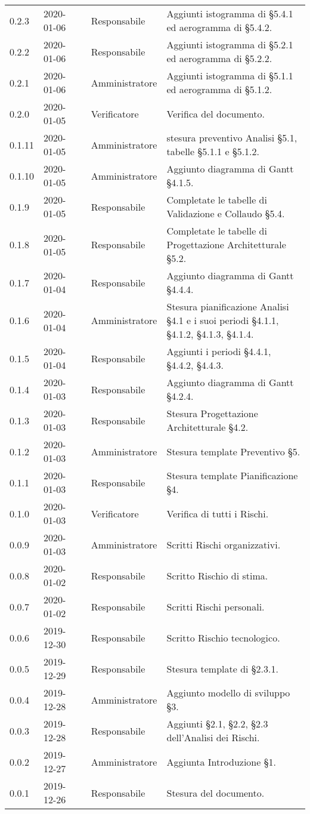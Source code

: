 {\begin{longtable}{C{2cm} C{2cm}  C{3cm}  C{3cm} C{4.5cm}}
0.2.3 & 2020-01-06 & \SE{} & Responsabile & Aggiunti istogramma di §5.4.1 ed aerogramma di §5.4.2. \\
0.2.2 & 2020-01-06 & \SE{} & Responsabile & Aggiunti istogramma di §5.2.1 ed aerogramma di §5.2.2. \\
0.2.1 & 2020-01-06 & \LD{} & Amministratore & Aggiunti istogramma di §5.1.1 ed aerogramma di §5.1.2. \\
0.2.0 & 2020-01-05 & \MC{} & Verificatore & Verifica del documento. \\
0.1.11 & 2020-01-05 & \LD{} & Amministratore & stesura preventivo Analisi §5.1, tabelle §5.1.1 e §5.1.2. \\
0.1.10 & 2020-01-05 & \LD{} & Amministratore & Aggiunto diagramma di Gantt §4.1.5. \\
0.1.9 & 2020-01-05 & \SE{} & Responsabile & Completate le tabelle di Validazione e Collaudo §5.4.\\
0.1.8 & 2020-01-05 & \SE{} & Responsabile & Completate le tabelle di Progettazione Architetturale §5.2. \\
0.1.7 & 2020-01-04 & \SE{} & Responsabile & Aggiunto diagramma di Gantt §4.4.4. \\
0.1.6 & 2020-01-04 & \LD{} & Amministratore & Stesura pianificazione Analisi §4.1 e i suoi periodi §4.1.1, §4.1.2, §4.1.3, §4.1.4. \\
0.1.5 & 2020-01-04 & \SE{} & Responsabile & Aggiunti i periodi §4.4.1, §4.4.2, §4.4.3. \\
0.1.4 & 2020-01-03 & \SE{} & Responsabile & Aggiunto diagramma di Gantt §4.2.4. \\
0.1.3 & 2020-01-03 & \SE{} & Responsabile & Stesura Progettazione Architetturale §4.2.\\
0.1.2 & 2020-01-03 & \LD{} & Amministratore & Stesura template Preventivo §5. \\
0.1.1 & 2020-01-03 & \SE{} & Responsabile & Stesura template Pianificazione §4. \\
0.1.0 & 2020-01-03 & \AT{} & Verificatore & Verifica di tutti i Rischi. \\
0.0.9 & 2020-01-03 & \LD{} & Amministratore & Scritti Rischi organizzativi. \\
0.0.8 & 2020-01-02 & \SE{} & Responsabile & Scritto Rischio di stima. \\
0.0.7 & 2020-01-02 & \SE{} & Responsabile & Scritti Rischi personali. \\
0.0.6 & 2019-12-30 & \SE{} & Responsabile & Scritto Rischio tecnologico. \\
0.0.5 & 2019-12-29 & \SE{} & Responsabile & Stesura template di §2.3.1. \\
0.0.4 & 2019-12-28 & \LD{} & Amministratore & Aggiunto modello di sviluppo §3. \\
0.0.3 & 2019-12-28 & \SE{} & Responsabile & Aggiunti §2.1, §2.2, §2.3 dell'Analisi dei Rischi. \\
0.0.2 & 2019-12-27 & \LD{} & Amministratore & Aggiunta Introduzione §1. \\
0.0.1 & 2019-12-26 & \SE{} & Responsabile & Stesura del documento. \\
		
\end{longtable}
}